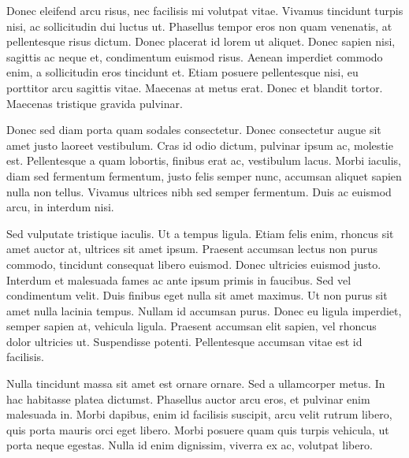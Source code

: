 Donec eleifend arcu risus, nec facilisis mi volutpat vitae. Vivamus tincidunt turpis nisi, ac sollicitudin dui luctus ut. Phasellus tempor eros non quam venenatis, at pellentesque risus dictum. Donec placerat id lorem ut aliquet. Donec sapien nisi, sagittis ac neque et, condimentum euismod risus. Aenean imperdiet commodo enim, a sollicitudin eros tincidunt et. Etiam posuere pellentesque nisi, eu porttitor arcu sagittis vitae. Maecenas at metus erat. Donec et blandit tortor. Maecenas tristique gravida pulvinar.

Donec sed diam porta quam sodales consectetur. Donec consectetur augue sit amet justo laoreet vestibulum. Cras id odio dictum, pulvinar ipsum ac, molestie est. Pellentesque a quam lobortis, finibus erat ac, vestibulum lacus. Morbi iaculis, diam sed fermentum fermentum, justo felis semper nunc, accumsan aliquet sapien nulla non tellus. Vivamus ultrices nibh sed semper fermentum. Duis ac euismod arcu, in interdum nisi.

Sed vulputate tristique iaculis. Ut a tempus ligula. Etiam felis enim, rhoncus sit amet auctor at, ultrices sit amet ipsum. Praesent accumsan lectus non purus commodo, tincidunt consequat libero euismod. Donec ultricies euismod justo. Interdum et malesuada fames ac ante ipsum primis in faucibus. Sed vel condimentum velit. Duis finibus eget nulla sit amet maximus. Ut non purus sit amet nulla lacinia tempus. Nullam id accumsan purus. Donec eu ligula imperdiet, semper sapien at, vehicula ligula. Praesent accumsan elit sapien, vel rhoncus dolor ultricies ut. Suspendisse potenti. Pellentesque accumsan vitae est id facilisis.

Nulla tincidunt massa sit amet est ornare ornare. Sed a ullamcorper metus. In hac habitasse platea dictumst. Phasellus auctor arcu eros, et pulvinar enim malesuada in. Morbi dapibus, enim id facilisis suscipit, arcu velit rutrum libero, quis porta mauris orci eget libero. Morbi posuere quam quis turpis vehicula, ut porta neque egestas. Nulla id enim dignissim, viverra ex ac, volutpat libero.

\glsresetall
